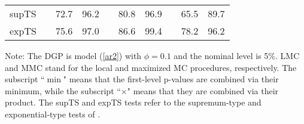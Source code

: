 \documentclass[11pt]{article}
\begin{document}
\begin{table}[p]
\begin{center}
\begin{tabular}{lrrrrrrrrr}
supTS &  & 72.7 & 96.2 &  & 80.8 & 96.9 &  & 65.5 & 89.7 \\ 
expTS &  & 75.6 & 97.0 &  & 86.6 & 99.4 &  & 78.2 & 96.2 \\ \hline\hline
\end{tabular}%
\end{center}
\par
Note: The DGP is model (\ref{ar2}) with $\phi=0.1$ and the nominal level is
5\%. LMC and MMC stand for the local and maximized MC procedures,
respectively. The subscript ``$\min$" means that the first-level p-values
are combined via their minimum, while the subscript ``$\times$" means that
they are combined via their product. The supTS and expTS tests refer to the
supremum-type and exponential-type tests of %
\citet{Carrasco-Hu-Ploberger:2014}.
\end{table}
\end{document}
